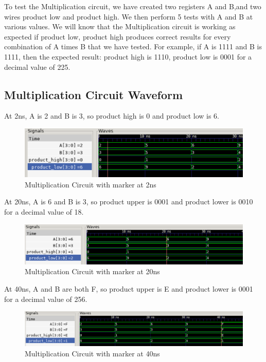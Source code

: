 \documentclass[12pt]{article}
\begin{document}
To test the Multiplication circuit, we have created two registers A and B,and two wires product low and product high. We then perform 5 tests with A and B at various values. We will know that the Multiplication circuit is working as expected if product low, product high produces correct results for every combination of A times B that we have tested. For example, if A is 1111 and B is 1111, then the expected result: product high is 1110, product low is 0001 for a decimal value of 225.

\subsection{Multiplication Circuit Waveform} 

At 2ns, A is 2 and B is 3, so product high is 0 and product low is 6.  
\begin{figure}[H]
 \centering
 \includegraphics[width = 1.0\textwidth]{Multiplication/multiplication_wave.png}
 \caption{Multiplication Circuit with marker at 2ns}
 \label{fig:enter-label} 
\end{figure} 

At 20ns, A is 6 and B is 3, so product upper is 0001 and product lower is 0010 for a decimal value of 18.  
 \begin{figure}[H]
 \centering 
\includegraphics[width = 1.0\textwidth]{Multiplication/multiplication_wave1.png}
 \caption{Multiplication Circuit with marker at 20ns}
 \label{fig:enter-label}
 \end{figure}

 At 40ns, A and B are both F, so product upper is E and product lower is 0001 for a decimal value of 256.
 \begin{figure}[H]
 \centering 
\includegraphics[width = 1.0\textwidth]{Multiplication/multiplication_wave2.png}
 \caption{Multiplication Circuit with marker at 40ns}
 \label{fig:enter-label}
 \end{figure}
\end{document}
